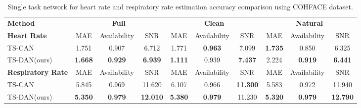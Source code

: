 \documentclass[conference]{IEEEtran}
\begin{document}
\begin{table*}[htbp]
\centering
\caption{Single task network for heart rate and respiratory rate estimation accuracy comparison using COHFACE dataset.}
\begin{tabular}{lccc|ccc|ccc}
\hline\noalign{\smallskip}
\bf{Method} & \multicolumn{3}{c}{\bf{Full}}  &  \multicolumn{3}{c}{\bf{Clean}} & \multicolumn{3}{c}{\bf{Natural}}\\
\noalign{\smallskip}
\hline
\noalign{\smallskip}
\textbf{Heart Rate} & MAE & Availability & SNR & MAE & Availability & SNR & MAE & Availability & SNR\\
TS-CAN\cite{liu2020multi} &1.751&0.907&6.712&1.771&  \textbf{0.963}& 7.099&\textbf{1.735}& 0.850& 6.325 \\
TS-DAN(ours) &\textbf{1.668}&\textbf{0.929}&\textbf{6.939}&\textbf{1.111}&0.939&\textbf{7.437}&2.224&\textbf{0.919}&\textbf{6.441} \\\hline
\textbf{Respiratory Rate} &  MAE & Availability & SNR & MAE & Availability & SNR & MAE & Availability & SNR\\
TS-CAN\cite{liu2020multi} &5.845&0.969&11.620&6.107&0.966&\textbf{11.300}&5.583&0.972&11.940 \\
TS-DAN(ours) &\textbf{5.350}&\textbf{0.979}&\textbf{12.010}&\textbf{5.380}&\textbf{0.979}&11.230&\textbf{5.320}&\textbf{0.979}&\textbf{12.790} \\
\hline
\end{tabular}
\label{cohface_single_task}
\end{table*}


\end{document}
